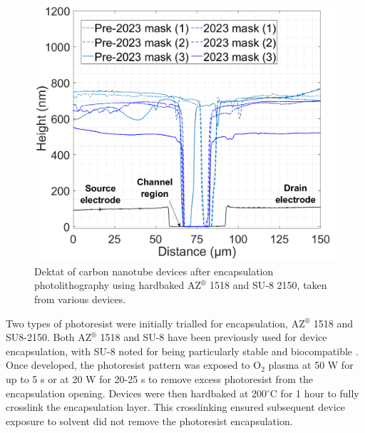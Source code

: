\documentclass[
  a4paper,
]{scrbook}
\begin{document}
\begin{figure}
\begin{minipage}[t]{0.47\linewidth}
{{\includegraphics{./figures/ch4/dektat_SU8_profile_comparison.png}

}

}

\end{minipage}%

\caption{\label{fig-dektat-encapsulation}Dektat of carbon nanotube
devices after encapsulation photolithography using hardbaked
AZ\(^\circledR\) 1518 and SU-8 2150, taken from various devices.}

\end{figure}

Two types of photoresist were initially trialled for encapsulation,
AZ\(^\circledR\) 1518 and SU8-2150. Both AZ\(^\circledR\) 1518
\autocite{Thanihaichelvan2018,Thanihaichelvan2019,Shkodra2021} and SU-8
have been previously used for device encapsulation, with SU-8 noted for
being particularly stable and biocompatible
\autocite{Lee2006,Chen2021,Albarghouthi2022}. Once developed, the
photoresist pattern was exposed to O\(_2\) plasma at 50 W for up to 5 s
or at 20 W for 20-25 s to remove excess photoresist from the
encapsulation opening. Devices were then hardbaked at 200\(^\circ\)C for
1 hour to fully crosslink the encapsulation layer. This crosslinking
ensured subsequent device exposure to solvent did not remove the
photoresist encapsulation.
\end{document}
